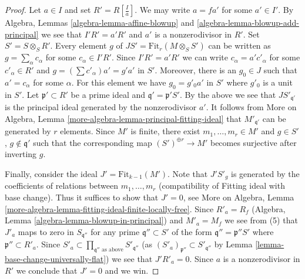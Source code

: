 \begin{proof}
\medskip\noindent
Let $a \in I$ and set $R' = R[\frac{I}{a}]$. We may write $a = fa'$
for some $a' \in I'$. By Algebra, Lemmas \ref{algebra-lemma-affine-blowup} and
\ref{algebra-lemma-blowup-add-principal} we see that $I' R' = a'R'$
and $a'$ is a nonzerodivisor in $R'$. Set $S' = S \otimes_S R'$.
Every element $g$ of $JS' = \text{Fit}_r(M \otimes_S S')$ can be
written as $g = \sum_\alpha c_\alpha$ for some $c_\alpha \in I'R'$.
Since $I'R' = a'R'$ we can write $c_\alpha = a'c'_\alpha$ for some
$c'_\alpha \in R'$ and $g = (\sum c'_\alpha)a' = g' a'$ in $S'$.
Moreover, there is an $g_0 \in J$ such that $a' = c_\alpha$
for some $\alpha$. For this element we have $g_0 = g'_0 a'$ in $S'$
where $g'_0$ is a unit in $S'$.
Let $\mathfrak p' \subset R'$ be
a prime ideal and $\mathfrak q' = \mathfrak p'S'$.
By the above we see that $JS'_{\mathfrak q'}$ is the
principal ideal generated by the nonzerodivisor $a'$.
It follows from More on Algebra, Lemma
\ref{more-algebra-lemma-principal-fitting-ideal}
that $M'_{\mathfrak q'}$ can be generated by $r$ elements.
Since $M'$ is finite, there exist $m_1, \ldots, m_r \in M'$ and
$g \in S'$, $g \not \in \mathfrak q'$ such that the corresponding map
$(S')^{\oplus r} \to M'$ becomes surjective after inverting $g$.

\medskip\noindent
Finally, consider the ideal $J' = \text{Fit}_{k - 1}(M')$.
Note that $J'S'_g$ is generated by the coefficients of relations between
$m_1, \ldots, m_r$ (compatibility of Fitting ideal with base change).
Thus it suffices to show that $J' = 0$, see
More on Algebra, Lemma
\ref{more-algebra-lemma-fitting-ideal-finite-locally-free}.
Since $R'_a = R_f$ (Algebra, Lemma \ref{algebra-lemma-blowup-in-principal})
and $M'_a = M_f$ we see from (5)
that $J'_a$ maps to zero in $S_{\mathfrak q''}$ for any prime
$\mathfrak q'' \subset S'$ of the form $\mathfrak q'' = \mathfrak p''S'$
where $\mathfrak p'' \subset R'_a$. Since
$S'_a \subset \prod_{\mathfrak q''\text{ as above}} S'_{\mathfrak q''}$
(as $(S'_a)_{\mathfrak p''} \subset S'_{\mathfrak q''}$ by
Lemma \ref{lemma-base-change-universally-flat})
we see that $J'R'_a = 0$. Since $a$ is a nonzerodivisor in $R'$ we
conclude that $J' = 0$ and we win.
\end{proof}

